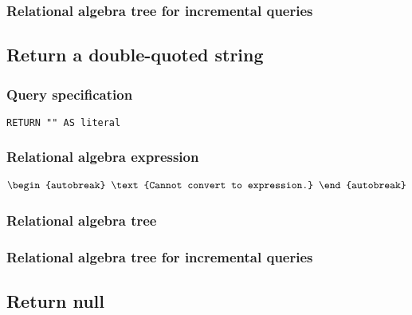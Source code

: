 
\subsubsection*{Relational algebra tree for incremental queries}


\subsection{Return a double-quoted string}

\subsubsection*{Query specification}

\begin{lstlisting}
RETURN "" AS literal
\end{lstlisting}

\subsubsection*{Relational algebra expression}

\begin{align*}
\begin{autobreak}
\text{Cannot convert to expression.}
\end{autobreak}
\end{align*}

\subsubsection*{Relational algebra tree}


\subsubsection*{Relational algebra tree for incremental queries}


\subsection{Return null}

